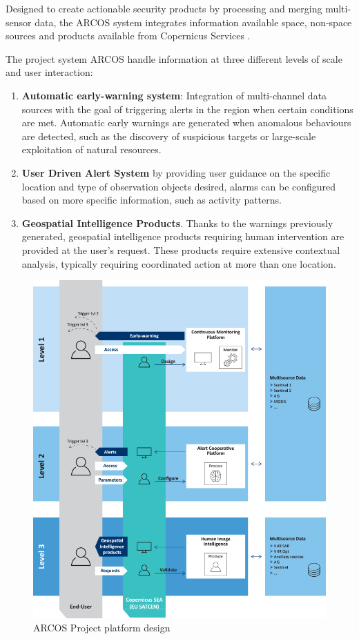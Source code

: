 Designed to create actionable security products by processing and merging multi-sensor data, the ARCOS system integrates information available space, non-space sources and products available from Copernicus Services \cite{copernicus}. 

The project system ARCOS handle information at three different levels of scale and user interaction:

\begin{enumerate}
\item \textbf{Automatic early-warning system}: Integration of multi-channel data sources with the goal of triggering alerts in the region when certain conditions are met. Automatic early warnings are generated when anomalous behaviours are detected, such as the discovery of suspicious targets or large-scale exploitation of natural resources.

\item \textbf{User Driven Alert System} by providing user guidance on the specific location and type of observation objects desired, alarms can be configured based on more specific information, such as activity patterns.

\item \textbf{Geospatial Intelligence Products}. Thanks to the warnings previously generated, geospatial intelligence products requiring human intervention are provided at the user's request. These products require extensive contextual analysis, typically requiring coordinated action at more than one location.
\end{enumerate}

\begin{figure}[H]
    \centering
    \includegraphics[width=13cm]{Images/1/arcos-design.png}
    \caption{ARCOS Project platform design \cite{arcos}}
\end{figure}


